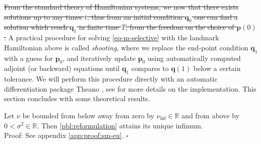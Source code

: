 \documentclass[runningheads]{llncs}
\newcommand{\nuinf}{\nu_\text{inf}}
\begin{document}
{\color{red}
\sout{From the standard theory of Hamiltonian systems, we now that there exists
solutions up to any times $t$, thus from an initial condition $\mathbf q_0$ one
can find a solution which reach $\mathbf q_1$ in finite time $T$, from the
freedom on the choice of $\mathbf p(0)$.} A practical procedure for solving
\eqref{eq-m-selective} with the landmark Hamiltonian above is called
\emph{shooting}, where we replace the end-point condition $\mathbf q_1$ with a
guess for $\mathbf p_0$, and iteratively update $\mathbf p_0$ using
automatically computed adjoint (or backward) equations until $\mathbf q_1$
compares to $\mathbf q(1)$ below a certain tolerance. We will perform this
procedure directly with an automatic differentiation package Theano
\cite{team2016theano}, see \cite{kuhnel2017computational,kuhnel2017differential}
for more details on the implementation.} This section concludes with some
theoretical results.
\begin{theorem}\label{sm-eu}
Let $\nu$ be bounded from below away from zero by $\nuinf \in \mathbb R$ and
from above by $0<\sigma^2\in\mathbb R$. Then \eqref{pbl:reformulation} attains
its unique infimum.\\

Proof: See appendix \ref{app:proof:sm-eu}.
{\hfill $\square$}
\end{theorem}
\end{document}
